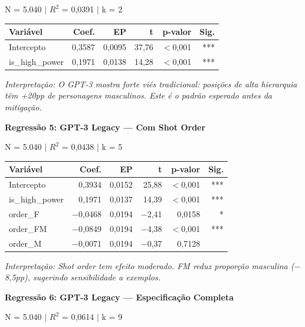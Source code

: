 \documentclass[12pt,a4paper]{article}
\begin{document}
\noindent N = 5.040 $|$ $R^2$ = 0,0391 $|$ k = 2

\begin{table}[H]
\centering
\begin{tabular}{lrrrrr}
\toprule
\textbf{Variável} & \textbf{Coef.} & \textbf{EP} & \textbf{t} & \textbf{p-valor} & \textbf{Sig.} \\
\midrule
Intercepto & 0,3587 & 0,0095 & 37,76 & $<$0,001 & *** \\
is\_high\_power & 0,1971 & 0,0138 & 14,28 & $<$0,001 & *** \\
\bottomrule
\end{tabular}
\end{table}

\noindent\textit{Interpretação: O GPT-3 mostra forte viés tradicional: posições de alta
hierarquia têm +20pp de personagens masculinos. Este é o padrão esperado
antes da mitigação.}

\vspace{0.5cm}
\noindent\textbf{Regressão 5: GPT-3 Legacy --- Com Shot Order}

\noindent N = 5.040 $|$ $R^2$ = 0,0438 $|$ k = 5

\begin{table}[H]
\centering
\begin{tabular}{lrrrrr}
\toprule
\textbf{Variável} & \textbf{Coef.} & \textbf{EP} & \textbf{t} & \textbf{p-valor} & \textbf{Sig.} \\
\midrule
Intercepto & 0,3934 & 0,0152 & 25,88 & $<$0,001 & *** \\
is\_high\_power & 0,1971 & 0,0137 & 14,39 & $<$0,001 & *** \\
order\_F & $-$0,0468 & 0,0194 & $-$2,41 & 0,0158 & * \\
order\_FM & $-$0,0849 & 0,0194 & $-$4,38 & $<$0,001 & *** \\
order\_M & $-$0,0071 & 0,0194 & $-$0,37 & 0,7128 & \\
\bottomrule
\end{tabular}
\end{table}

\noindent\textit{Interpretação: Shot order tem efeito moderado. FM reduz proporção
masculina ($-$8,5pp), sugerindo sensibilidade a exemplos.}

\vspace{0.5cm}
\noindent\textbf{Regressão 6: GPT-3 Legacy --- Especificação Completa}

\noindent N = 5.040 $|$ $R^2$ = 0,0614 $|$ k = 9
\end{document}
